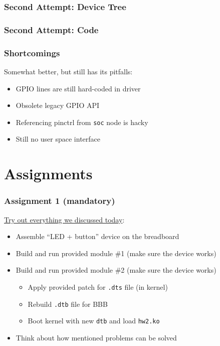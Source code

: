 \documentclass[aspectratio=169,usenames,dvipsnames]{beamer}
\newcounter{cont}
\begin{document}
\begin{frame}[containsverbatim]
  \frametitle{Second Attempt: Device Tree}
  
\end{frame}

\begin{frame}[containsverbatim,allowframebreaks=1]
  \frametitle{Second Attempt: Code}
  
\end{frame}

\begin{frame}
  \frametitle{Shortcomings}
  Somewhat better, but still has its pitfalls:
  \begin{itemize}
    \item GPIO lines are still hard-coded in driver
    \item Obsolete legacy GPIO API
    \item Referencing pinctrl from \texttt{soc} node is hacky
    \item Still no user space interface
  \end{itemize}
\end{frame}

\section{Assignments}

\begin{frame}
  \frametitle{Assignment 1 (mandatory)}
  \underline{Try out everything we discussed today}:
  \begin{itemize}
    \item Assemble ``LED + button'' device on the breadboard
    \item Build and run provided module \#1 (make sure the device works)
    \item Build and run provided module \#2 (make sure the device works)
    \begin{itemize}
      \item Apply provided patch for \texttt{.dts} file (in kernel)
      \item Rebuild \texttt{.dtb} file for BBB
      \item Boot kernel with new \texttt{dtb} and load \texttt{hw2.ko}
    \end{itemize}
    \item Think about how mentioned problems can be solved
  \end{itemize}
\end{frame}
\end{document}
